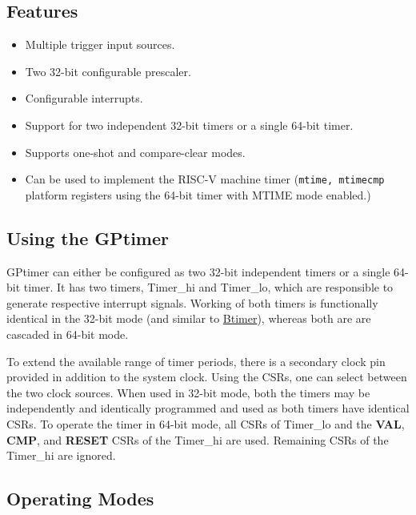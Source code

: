 \subsection*{Features} 

\begin{itemize}
  \item Multiple trigger input sources.
  \item Two 32-bit configurable prescaler.
  \item Configurable interrupts.
  \item Support for two independent 32-bit timers or a single 64-bit timer.
  \item Supports one-shot and compare-clear modes.  
  \item Can be used to implement the RISC-V machine timer (\texttt{mtime, mtimecmp} platform registers using the 64-bit timer with MTIME mode enabled.) 
\end{itemize}

\subsection{Using the GPtimer}

GPtimer can either be configured as two 32-bit independent timers or a single 64-bit timer. It has two timers, Timer\_hi and Timer\_lo, which are responsible to generate respective interrupt signals. Working of both timers is functionally identical in the 32-bit mode (and similar to \hyperref[sec:sw-basic-timer]{Btimer}), whereas both are are cascaded in 64-bit mode. 

To extend the available range of timer periods, there is a secondary clock pin provided in addition to the system clock. Using the CSRs, one can select between the two clock sources. When used in 32-bit mode, both the timers may be independently and identically programmed and used as both timers have identical CSRs. To operate the timer in 64-bit mode, all CSRs of Timer\_lo and the \textbf{VAL}, \textbf{CMP}, and \textbf{RESET} CSRs of the Timer\_hi are used. Remaining CSRs of the Timer\_hi are ignored. 

\subsection{Operating Modes} 

